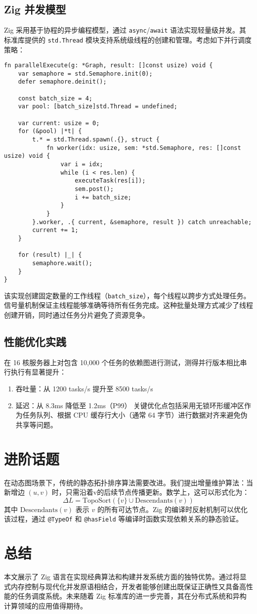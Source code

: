 \section{Zig 并发模型}
Zig 采用基于协程的异步编程模型，通过 \verb!async!/\verb!await! 语法实现轻量级并发。其标准库提供的 \verb!std.Thread! 模块支持系统级线程的创建和管理。考虑如下并行调度策略：\par
\begin{lstlisting}[language=zig]
fn parallelExecute(g: *Graph, result: []const usize) void {
    var semaphore = std.Semaphore.init(0);
    defer semaphore.deinit();

    const batch_size = 4;
    var pool: [batch_size]std.Thread = undefined;

    var current: usize = 0;
    for (&pool) |*t| {
        t.* = std.Thread.spawn(.{}, struct {
            fn worker(idx: usize, sem: *std.Semaphore, res: []const usize) void {
                var i = idx;
                while (i < res.len) {
                    executeTask(res[i]);
                    sem.post();
                    i += batch_size;
                }
            }
        }.worker, .{ current, &semaphore, result }) catch unreachable;
        current += 1;
    }

    for (result) |_| {
        semaphore.wait();
    }
}
\end{lstlisting}
该实现创建固定数量的工作线程（\verb!batch_size!），每个线程以跨步方式处理任务。信号量机制保证主线程能够准确等待所有任务完成。这种批量处理方式减少了线程创建开销，同时通过任务分片避免了资源竞争。\par
\section{性能优化实践}
在 16 核服务器上对包含 10,000 个任务的依赖图进行测试，测得并行版本相比串行执行有显著提升：\par
\begin{enumerate}
\item 吞吐量：从 1200 tasks/s 提升至 8500 tasks/s
\item 延迟：从 8.3ms 降低至 1.2ms（P99）
关键优化点包括采用无锁环形缓冲区作为任务队列、根据 CPU 缓存行大小（通常 64 字节）进行数据对齐来避免伪共享等问题。
\end{enumerate}
\chapter{进阶话题}
在动态图场景下，传统的静态拓扑排序算法需要改进。我们提出增量维护算法：当新增边 $(u, v)$ 时，只需沿着v的后续节点传播更新。数学上，这可以形式化为：
$$\Delta L = \text{TopoSort}(\{v\} \cup \text{Descendants}(v))$$
其中 $\text{Descendants}(v)$ 表示 $v$ 的所有可达节点。Zig 的编译时反射机制可以优化该过程，通过 \verb!@TypeOf! 和 \verb!@hasField! 等编译时函数实现依赖关系的静态验证。\par
\chapter{总结}
本文展示了 Zig 语言在实现经典算法和构建并发系统方面的独特优势。通过将显式内存控制与现代化并发原语相结合，开发者能够创建出既保证正确性又具备高性能的任务调度系统。未来随着 Zig 标准库的进一步完善，其在分布式系统和异构计算领域的应用值得期待。\par
